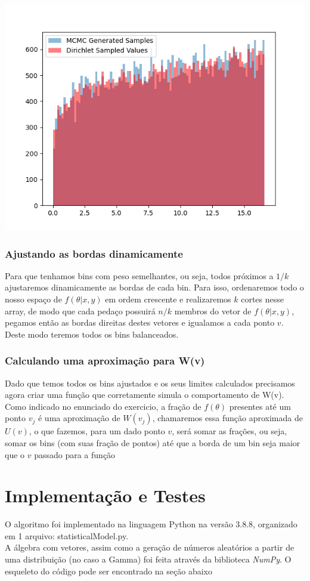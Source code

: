 \documentclass[twocolumn,amsmath,amssymb,floatfix]{revtex4}
\begin{document}
\includegraphics[scale=0.55]{dist.png}
\subsubsection{Ajustando as bordas dinamicamente}
\indent Para que tenhamos bins com peso semelhantes, ou seja, todos próximos a $1/k$ ajustaremos dinamicamente as bordas de cada bin. Para isso, ordenaremos todo o nosso espaço de $f(\theta | x,y)$ em ordem crescente e realizaremos $k$ cortes nesse array, de modo que cada pedaço possuirá $n/k$ membros do vetor de $f(\theta | x,y)$, pegamos então as bordas direitas destes vetores e igualamos a cada ponto $v$.  Deste modo teremos todos os bins balanceados.
\subsubsection{Calculando uma aproximação para W(v)}
\indent Dado que temos todos os bins ajustados e os seus limites calculados precisamos agora criar uma função que corretamente simula o comportamento de W(v). \\ 
\indent Como indicado no enunciado do exercicio, a fração de $f(\theta)$ presentes até um ponto $v_j$ é uma aproximação de $W(v_j)$, chamaremos essa função aproximada de $U(v)$, o que fazemos, para um dado ponto $v$, será somar as frações, ou seja, somar os bins (com suas fração de pontos) até que a borda de um bin seja maior que o $v$ passado para a função
\section{Implementação e Testes}
\indent O algoritmo foi implementado na linguagem Python na versão 3.8.8, organizado em 1 arquivo: statisticalModel.py. \\
\indent A álgebra com vetores, assim como a geração de números aleatórios a partir de uma distribuição (no caso a Gamma) foi feita através da biblioteca \textit{NumPy}. O esqueleto do código pode ser encontrado na seção abaixo 
\end{document}
